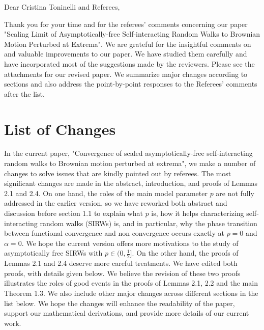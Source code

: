 \documentclass[11pt,a4paper]{article}
\numberwithin{equation}{section}
\newcommand{\edt}[1]{\textcolor{purple}{#1}} %
\begin{document}
	\noindent Dear Cristina Toninelli and Referees,
	
	Thank you for your time and for the referees' comments concerning our paper "Scaling Limit of Asymptotically-free Self-interacting
	Random Walks to Brownian Motion Perturbed at
	Extrema". We are grateful for the insightful comments on and valuable improvements to our paper. We have studied them carefully and have incorporated most of the suggestions made by the reviewers. Please see the attachments for our revised paper. 
	We summarize major changes according to sections and also address the point-by-point responses to the Referees' comments after the list.
	
	\section*{List of Changes}
	In the current paper, "Convergence of scaled asymptotically-free
	self-interacting random walks to Brownian motion
	perturbed at extrema", we make a number of changes to solve issues that are kindly pointed out by referees.
	The most significant changes are made in the abstract, introduction, and proofs of Lemmas 2.1 and 2.4. On one hand, the roles of the main model parameter $p$ are not fully addressed in the earlier version, so we have reworked both abstract and discussion before section 1.1
	to explain what $p$ is, how it helps characterizing self-interacting random walks (SIRWs) is, and in particular, why the phase transition between functional convergence and non convergence occurs exactly at $p=0$ and $\alpha =0$. We hope the current version offers more motivations to the study of asymptotically free SIRWs with $p\in (0,\frac{1}{2}]$. On the other hand, the proofs of Lemmas 2.1 and 2.4 deserve more careful treatments. We have edited both proofs, with details given below. We believe the revision of these two proofs illustrates the roles of good events in the proofs of Lemmas 2.1, 2.2 and the main Theorem 1.3.   
	We also include other major changes across different sections in the list below. We hope the changes will enhance the readability of the paper, support our mathematical derivations, and provide more details of our current work.
	
\end{document}
